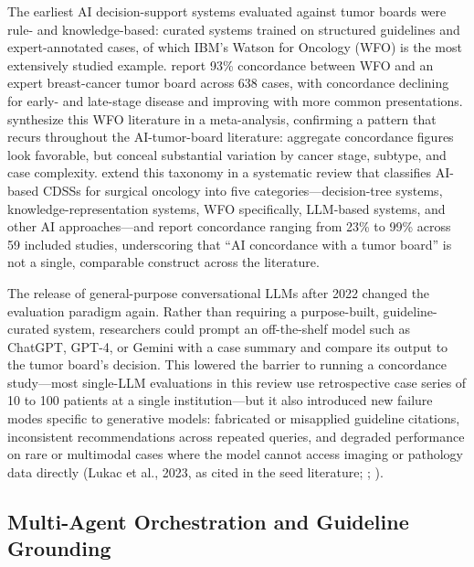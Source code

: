 \documentclass{article}
\begin{document}
The earliest AI decision-support systems evaluated against tumor boards were rule- and knowledge-based: curated systems trained on structured guidelines and expert-annotated cases, of which IBM's Watson for Oncology (WFO) is the most extensively studied example. \citet{somashekhar2018} report 93\% concordance between WFO and an expert breast-cancer tumor board across 638 cases, with concordance declining for early- and late-stage disease and improving with more common presentations. \citet{jie2021} synthesize this WFO literature in a meta-analysis, confirming a pattern that recurs throughout the AI-tumor-board literature: aggregate concordance figures look favorable, but conceal substantial variation by cancer stage, subtype, and case complexity. \citet{wu2026} extend this taxonomy in a systematic review that classifies AI-based CDSSs for surgical oncology into five categories---decision-tree systems, knowledge-representation systems, WFO specifically, LLM-based systems, and other AI approaches---and report concordance ranging from 23\% to 99\% across 59 included studies, underscoring that ``AI concordance with a tumor board'' is not a single, comparable construct across the literature.

The release of general-purpose conversational LLMs after 2022 changed the evaluation paradigm again. Rather than requiring a purpose-built, guideline-curated system, researchers could prompt an off-the-shelf model such as ChatGPT, GPT-4, or Gemini with a case summary and compare its output to the tumor board's decision. This lowered the barrier to running a concordance study---most single-LLM evaluations in this review use retrospective case series of 10 to 100 patients at a single institution---but it also introduced new failure modes specific to generative models: fabricated or misapplied guideline citations, inconsistent recommendations across repeated queries, and degraded performance on rare or multimodal cases where the model cannot access imaging or pathology data directly (Lukac et al., 2023, as cited in the seed literature; \citealp{chatziisaak2025}; \citealp{ciulli2026}).

\subsection{Multi-Agent Orchestration and Guideline Grounding}
\end{document}
